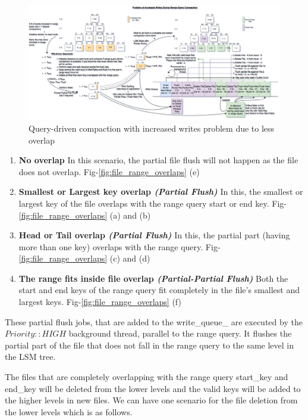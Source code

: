 \begin{figure}
    \includegraphics[scale=0.12]{Figures/RQ-driven problem of increased writes.png}
    \caption{Query-driven compaction with increased writes problem due to less overlap}\label{fig:query-driven_compaction_with_increased_writes}
\end{figure}

\begin{enumerate}[leftmargin=*,labelindent=0mm, itemsep=0.2\baselineskip]
    \item \textbf{No overlap} In this scenario, the partial file flush will not happen as the file does not overlap. 
    Fig-\ref{fig:file_range_overlaps} (e)
    \item \textbf{Smallest or Largest key overlap \textit{(Partial Flush)}} In this, the smallest or largest key of the 
    file overlaps with the range query start or end key. Fig-\ref{fig:file_range_overlaps} (a) and (b)
    \item \textbf{Head or Tail overlap \textit{(Partial Flush)}} In this, the partial part (having more than one key) 
    overlaps with the range query. Fig-\ref{fig:file_range_overlaps} (c) and (d)
    \item \textbf{The range fits inside file overlap \textit{(Partial-Partial Flush)}} Both the start and end keys of 
    the range query fit completely in the file's smallest and largest keys. Fig-\ref{fig:file_range_overlaps} (f)
\end{enumerate}

These partial flush jobs, that are added to the write\_queue\_ are executed by the $Priority::HIGH$ background thread, 
parallel to the range query. It flushes the partial part of the file that does not fall in the range query to the same 
level in the LSM tree.

The files that are completely overlapping with the range query start\_key and end\_key will be deleted from the lower 
levels and the valid keys will be added to the higher levels in new files. We can have one scenario for the file 
deletion from the lower levels which is as follows.

